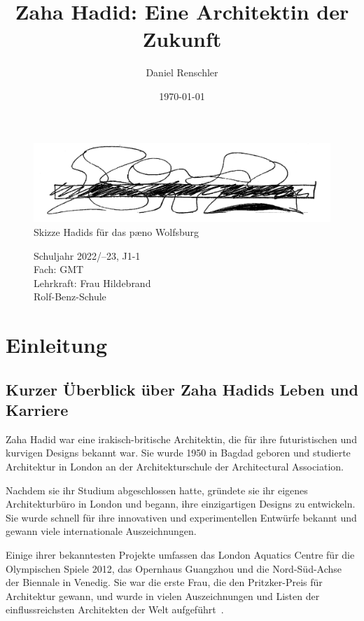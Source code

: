 \documentclass[a4paper]{article}
\begin{document}
\title{Zaha Hadid: Eine Architektin der Zukunft}
\author{Daniel Renschler}
\date{\today}
\maketitle

\begin{figure}[h]
\includegraphics[width=\linewidth]{paeno-sketch.jpg}
\caption{Skizze Hadids für das pæno Wolfsburg\cite{article_creative_energy_sketches}}
\end{figure}

\begin{figure}[!h]
\centering
\large
Schuljahr 2022/–23, J1-1 \\
Fach: GMT \\
Lehrkraft: Frau Hildebrand \\
Rolf-Benz-Schule 

\end{figure}
\thispagestyle{empty}
\clearpage
\tableofcontents
\clearpage


\section{Einleitung}
\subsection{Kurzer Überblick über Zaha Hadids Leben und Karriere}
Zaha Hadid war eine irakisch-britische Architektin, die für ihre futuristischen
und kurvigen Designs bekannt war. Sie wurde 1950 in Bagdad geboren und studierte
Architektur in London an der Architekturschule der Architectural
Association.\cite{hadid_britannica}

Nachdem sie ihr Studium abgeschlossen hatte, gründete sie ihr eigenes
Architekturbüro in London und begann, ihre einzigartigen Designs zu entwickeln.
Sie wurde schnell für ihre innovativen und experimentellen Entwürfe bekannt und
gewann viele internationale Auszeichnungen.

Einige ihrer bekanntesten Projekte umfassen das London Aquatics Centre für die
Olympischen Spiele 2012, das Opernhaus Guangzhou und die Nord-Süd-Achse
der Biennale in Venedig. Sie war die erste Frau, die den Pritzker-Preis für
Architektur gewann, und wurde in vielen Auszeichnungen und Listen der
einflussreichsten Architekten der Welt aufgeführt~\cite{ZahaHadidAwards}.
\end{document}
